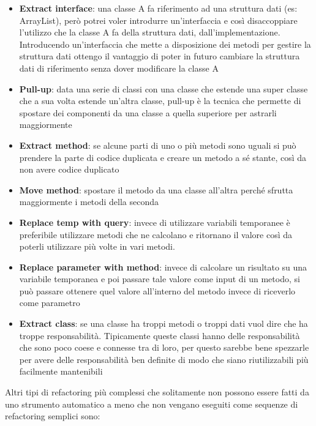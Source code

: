 \begin{itemize}[noitemsep]
    \item \textbf{Extract interface}: una classe A fa riferimento ad una struttura dati (es: ArrayList), però potrei voler introdurre un'interfaccia e così disaccoppiare l'utilizzo che la classe A fa della struttura dati, dall'implementazione. Introducendo un'interfaccia che mette a disposizione dei metodi per gestire la struttura dati ottengo il vantaggio di poter in futuro cambiare la struttura dati di riferimento senza dover modificare la classe A
    \item \textbf{Pull-up}: data una serie di classi con una classe che estende una super classe che a sua volta estende un'altra classe, pull-up è la tecnica che permette di spostare dei componenti da una classe a quella superiore per astrarli maggiormente
    \item \textbf{Extract method}: se alcune parti di uno o più metodi sono uguali si può prendere la parte di codice duplicata e creare un metodo a sé stante, così da non avere codice duplicato
    \item \textbf{Move method}: spostare il metodo da una classe all'altra perché sfrutta maggiormente i metodi della seconda
    \item \textbf{Replace temp with query}: invece di utilizzare variabili temporanee è preferibile utilizzare metodi che ne calcolano e ritornano il valore così da poterli utilizzare più volte in vari metodi.
    \item \textbf{Replace parameter with method}: invece di calcolare un risultato su una variabile temporanea e poi passare tale valore come input di un metodo, si può passare ottenere quel valore all'interno del metodo invece di riceverlo come parametro
    \item \textbf{Extract class}: se una classe ha troppi metodi o troppi dati vuol dire che ha troppe responsabilità. Tipicamente queste classi hanno delle responsabilità che sono poco coese e connesse tra di loro, per questo sarebbe bene spezzarle per avere delle responsabilità ben definite di modo che siano riutilizzabili più facilmente mantenibili
\end{itemize}
Altri tipi di refactoring più complessi che solitamente non possono essere fatti da uno strumento automatico a meno che non vengano eseguiti come sequenze di refactoring semplici sono:
